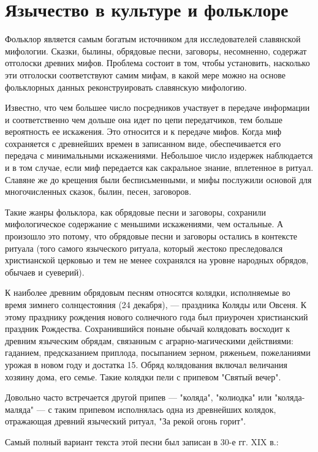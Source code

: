 \documentclass[a4paper, 12pt]{report}
\begin{document}
\chapter{Язычество в культуре и фольклоре} 

Фольклор является самым богатым источником для исследователей славянской мифологии. Сказки, былины, обрядовые песни, заговоры, несомненно, содержат отголоски древних мифов. Проблема состоит в том, чтобы установить, насколько эти отголоски соответствуют самим мифам, в какой мере можно на основе фольклорных данных реконструировать славянскую мифологию.

Известно, что чем большее число посредников участвует в передаче информации и соответственно чем дольше она идет по цепи передатчиков, тем больше вероятность ее искажения. Это относится и к передаче мифов. Когда миф сохраняется с древнейших времен в записанном виде, обеспечивается его передача с минимальными искажениями. Небольшое число издержек наблюдается и в том случае, если миф передается как сакральное знание, вплетенное в ритуал. Славяне же до крещения были бесписьменными, и мифы послужили основой для многочисленных сказок, былин, песен, заговоров.

Такие жанры фольклора, как обрядовые песни и заговоры, сохранили мифологическое содержание с меньшими искажениями, чем остальные. А произошло это потому, что обрядовые песни и заговоры остались в контексте ритуала (того самого языческого ритуала, который жестоко преследовался христианской церковью и тем не менее сохранялся на уровне народных обрядов, обычаев и суеверий).


К наиболее древним обрядовым песням относятся колядки, исполняемые во время зимнего солнцестояния (24 декабря), — праздника Коляды или Овсеня. К этому празднику рождения нового солнечного года был приурочен христианский праздник Рождества. Сохранившийся поныне обычай колядовать восходит к древним языческим обрядам, связанным с аграрно-магическими действиями: гаданием, предсказанием приплода, посыпанием зерном, ряженьем, пожеланиями урожая в новом году и достатка 15. Обряд колядования включал величания хозяину дома, его семье. Такие колядки пели с припевом "Святый вечер".

Довольно часто встречается другой припев — "коляда", "колиодка" или "коляда-маляда" — с таким припевом исполнялась одна из древнейших колядок, отражающая древний языческий ритуал, "За рекой огонь горит".

Самый полный вариант текста этой песни был записан в 30-е гг. XIX в.:
\end{document}
